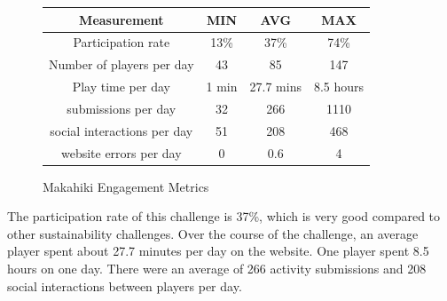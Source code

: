 \documentclass{sigchi}
\newcommand\tabhead[1]{\small\textbf{#1}}
\begin{document}
\begin{figure}[ht!]
  \centering
  \begin{tabular}{|c|c|c|c}
    \hline
    \multicolumn{1}{|p{0.5\columnwidth}|}{\centering\tabhead{Measurement}} &
    \multicolumn{1}{|p{0.1\columnwidth}|}{\centering\tabhead{MIN}} &
    \multicolumn{1}{|p{0.1\columnwidth}|}{\centering\tabhead{AVG}} &
    \multicolumn{1}{|p{0.1\columnwidth}|}{\centering\tabhead{MAX}} \\
    \hline
    \multicolumn{1}{|p{0.5\columnwidth}|}{Participation rate} &
    \multicolumn{1}{|p{0.1\columnwidth}|}{13\%} &
    \multicolumn{1}{|p{0.1\columnwidth}|}{37\%} &
    \multicolumn{1}{|p{0.1\columnwidth}|}{74\%} \\
    \hline
    \multicolumn{1}{|p{0.5\columnwidth}|}{Number of players per day} &
    \multicolumn{1}{|p{0.1\columnwidth}|}{43} &
    \multicolumn{1}{|p{0.1\columnwidth}|}{85} &
    \multicolumn{1}{|p{0.1\columnwidth}|}{147} \\
    \hline
    \multicolumn{1}{|p{0.5\columnwidth}|}{Play time per day} &
    \multicolumn{1}{|p{0.1\columnwidth}|}{1 min} &
    \multicolumn{1}{|p{0.1\columnwidth}|}{27.7 mins} &
    \multicolumn{1}{|p{0.1\columnwidth}|}{8.5 hours} \\
    \hline
    \multicolumn{1}{|p{0.5\columnwidth}|}{submissions per day} &
    \multicolumn{1}{|p{0.1\columnwidth}|}{32} &
    \multicolumn{1}{|p{0.1\columnwidth}|}{266} &
    \multicolumn{1}{|p{0.1\columnwidth}|}{1110} \\
    \hline
    \multicolumn{1}{|p{0.5\columnwidth}|}{social interactions per day} &
    \multicolumn{1}{|p{0.1\columnwidth}|}{51} &
    \multicolumn{1}{|p{0.1\columnwidth}|}{208} &
    \multicolumn{1}{|p{0.1\columnwidth}|}{468} \\
    \hline
    \multicolumn{1}{|p{0.5\columnwidth}|}{website errors per day} &
    \multicolumn{1}{|p{0.1\columnwidth}|}{0} &
    \multicolumn{1}{|p{0.1\columnwidth}|}{0.6} &
    \multicolumn{1}{|p{0.1\columnwidth}|}{4} \\
    \hline
  \end{tabular}
  \caption{Makahiki Engagement Metrics}
  \label{fig:makahiki-engagement}
\end{figure}

The participation rate of this challenge is 37\%, which is very good compared to other
sustainability challenges. Over the course of the challenge, an average player spent about
27.7 minutes per day on the website. One player spent 8.5 hours on one day. There were an
average of 266 activity submissions and 208 social interactions between players per day.
\end{document}
